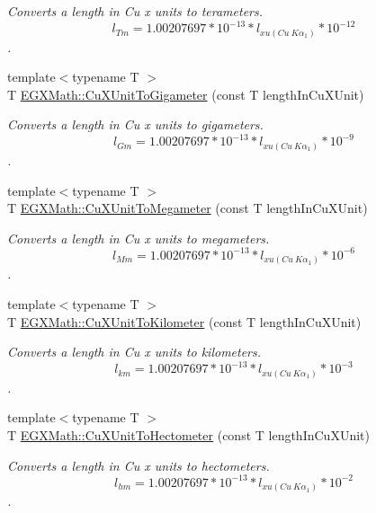 \begin{DoxyCompactItemize}
\begin{DoxyCompactList}\small\item\em Converts a length in Cu x units to terameters. \[ l_{Tm}=1.00207697*10^{-13} * l_{xu(Cu\ K\alpha_1)} * 10^{-12} \]. \end{DoxyCompactList}\item 
{\footnotesize template$<$typename T $>$ }\\T \mbox{\hyperlink{group___e_g_x_math-_conversions-_length_conversions-_non-_s_i-_cu_x_unit-_s_i_ga0b99d0bc9eb9a673d2eba2fa595a1866}{E\+G\+X\+Math\+::\+Cu\+X\+Unit\+To\+Gigameter}} (const T length\+In\+Cu\+X\+Unit)
\begin{DoxyCompactList}\small\item\em Converts a length in Cu x units to gigameters. \[ l_{Gm}=1.00207697*10^{-13} * l_{xu(Cu\ K\alpha_1)} * 10^{-9} \]. \end{DoxyCompactList}\item 
{\footnotesize template$<$typename T $>$ }\\T \mbox{\hyperlink{group___e_g_x_math-_conversions-_length_conversions-_non-_s_i-_cu_x_unit-_s_i_ga78c09f3730329cab2764fc8c488f6274}{E\+G\+X\+Math\+::\+Cu\+X\+Unit\+To\+Megameter}} (const T length\+In\+Cu\+X\+Unit)
\begin{DoxyCompactList}\small\item\em Converts a length in Cu x units to megameters. \[ l_{Mm}=1.00207697*10^{-13} * l_{xu(Cu\ K\alpha_1)} * 10^{-6} \]. \end{DoxyCompactList}\item 
{\footnotesize template$<$typename T $>$ }\\T \mbox{\hyperlink{group___e_g_x_math-_conversions-_length_conversions-_non-_s_i-_cu_x_unit-_s_i_ga8a35facc4ac2da0fdda3cfe2bfb22d5c}{E\+G\+X\+Math\+::\+Cu\+X\+Unit\+To\+Kilometer}} (const T length\+In\+Cu\+X\+Unit)
\begin{DoxyCompactList}\small\item\em Converts a length in Cu x units to kilometers. \[ l_{km}=1.00207697*10^{-13} * l_{xu(Cu\ K\alpha_1)} * 10^{-3} \]. \end{DoxyCompactList}\item 
{\footnotesize template$<$typename T $>$ }\\T \mbox{\hyperlink{group___e_g_x_math-_conversions-_length_conversions-_non-_s_i-_cu_x_unit-_s_i_ga2174090c2a3f2fefcb6a1e5ac8e2e903}{E\+G\+X\+Math\+::\+Cu\+X\+Unit\+To\+Hectometer}} (const T length\+In\+Cu\+X\+Unit)
\begin{DoxyCompactList}\small\item\em Converts a length in Cu x units to hectometers. \[ l_{hm}=1.00207697*10^{-13} * l_{xu(Cu\ K\alpha_1)} * 10^{-2} \]. \end{DoxyCompactList}\item 

\end{DoxyCompactItemize}
